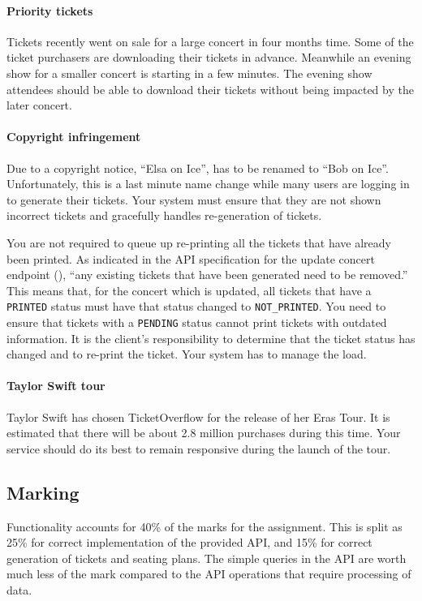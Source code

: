 \documentclass{csse4400}
\begin{document}
\paragraph{Priority tickets}
Tickets recently went on sale for a large concert in four months time.
Some of the ticket purchasers are downloading their tickets in advance.
Meanwhile an evening show for a smaller concert is starting in a few minutes.
The evening show attendees should be able to download their tickets without being impacted by the later concert.

\paragraph{Copyright infringement}
Due to a copyright notice, ``Elsa on Ice'', has to be renamed to ``Bob on Ice''.
Unfortunately, this is a last minute name change while many users are logging in to generate their tickets.
Your system must ensure that they are not shown incorrect tickets and gracefully handles re-generation of tickets.

You are not required to queue up re-printing all the tickets that have already been printed.
As indicated in the API specification for the update concert endpoint
(),
``any existing tickets that have been generated need to be removed.''
This means that, for the concert which is updated, all tickets that have a \texttt{PRINTED}
status must have that status changed to \texttt{NOT\_PRINTED}.
You need to ensure that tickets with a \texttt{PENDING} status cannot print tickets with outdated information.
It is the client's responsibility to determine that the ticket status has changed and to re-print the ticket.
Your system has to manage the load.

\paragraph{Taylor Swift tour}
Taylor Swift has chosen TicketOverflow for the release of her Eras Tour.
It is estimated that there will be about 2.8 million purchases during this time.
Your service should do its best to remain responsive during the launch of the tour.


\subsection{Marking}
Functionality accounts for 40\% of the marks for the assignment.
This is split as 25\% for correct implementation of the provided API,
and 15\% for correct generation of tickets and seating plans.
The simple queries in the API are worth much less of the mark compared to the API operations that require processing of data.
\end{document}
